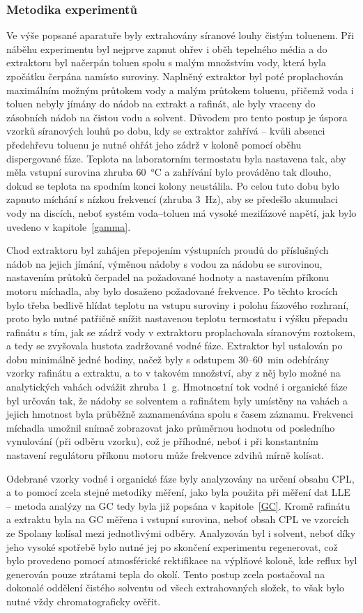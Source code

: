 \subsubsection{Metodika experimentů} \label{labmodel_m}
Ve výše popsané aparatuře byly extrahovány síranové louhy čistým toluenem.
Při náběhu experimentu byl nejprve zapnut ohřev i oběh tepelného média a do extraktoru byl načerpán toluen spolu s malým množstvím vody, která byla zpočátku čerpána namísto suroviny.
Naplněný extraktor byl poté proplachován maximálním možným průtokem vody a malým průtokem toluenu, přičemž voda i toluen nebyly jímány do nádob na extrakt a rafinát, ale byly vraceny do zásobních nádob na čistou vodu a solvent.
Důvodem pro tento postup je úspora vzorků síranových louhů po dobu, kdy se extraktor zahřívá -- kvůli absenci předehřevu toluenu je nutné ohřát jeho zádrž v koloně pomocí oběhu dispergované fáze.
Teplota na laboratorním termostatu byla nastavena tak, aby měla vstupní surovina zhruba 60~°C a zahřívání bylo prováděno tak dlouho, dokud se teplota na spodním konci kolony neustálila.
Po celou tuto dobu bylo zapnuto míchání s nízkou frekvencí (zhruba 3~Hz), aby se předešlo akumulaci vody na discích, neboť systém voda--toluen má vysoké mezifázové napětí, jak bylo uvedeno v kapitole~\ref{gamma}.

Chod extraktoru byl zahájen přepojením výstupních proudů do příslušných nádob na jejich jímání, výměnou nádoby s vodou za nádobu se surovinou, nastavením průtoků čerpadel na požadované hodnoty a nastavením příkonu motoru míchadla, aby bylo dosaženo požadované frekvence.
Po těchto krocích bylo třeba bedlivě hlídat teplotu na vstupu suroviny i polohu fázového rozhraní, proto bylo nutné patřičně snížit nastavenou teplotu termostatu i výšku přepadu rafinátu s tím, jak se zádrž vody v extraktoru proplachovala síranovým roztokem, a tedy se zvyšovala hustota zadržované vodné fáze.
Extraktor byl ustalován po dobu minimálně jedné hodiny, načež byly s odstupem 30--60~min odebírány vzorky rafinátu a extraktu, a to v takovém množství, aby z něj bylo možné na analytických vahách odvážit zhruba 1~g.
Hmotnostní tok vodné i organické fáze byl určován tak, že nádoby se solventem a rafinátem byly umístěny na vahách a jejich hmotnost byla průběžně zaznamenávána spolu s časem záznamu.
Frekvenci míchadla umožnil snímač zobrazovat jako průměrnou hodnotu od posledního vynulování (při odběru vzorku), což je příhodné, neboť i při konstantním nastavení regulátoru příkonu motoru může frekvence zdvihů mírně kolísat.

Odebrané vzorky vodné i organické fáze byly analyzovány na určení obsahu CPL, a to pomocí zcela stejné metodiky měření, jako byla použita při měření dat LLE -- metoda analýzy na GC tedy byla již popsána v kapitole~\ref{GC}.
Kromě rafinátu a extraktu byla na GC měřena i vstupní surovina, neboť obsah CPL ve vzorcích ze Spolany kolísal mezi jednotlivými odběry.
Analyzován byl i solvent, neboť díky jeho vysoké spotřebě bylo nutné jej po skončení experimentu regenerovat, což bylo provedeno pomocí atmosférické rektifikace na výplňové koloně, kde reflux byl generován pouze ztrátami tepla do okolí. Tento postup zcela postačoval na dokonalé oddělení čistého solventu od všech extrahovaných složek, to však bylo nutné vždy chromatograficky ověřit.

